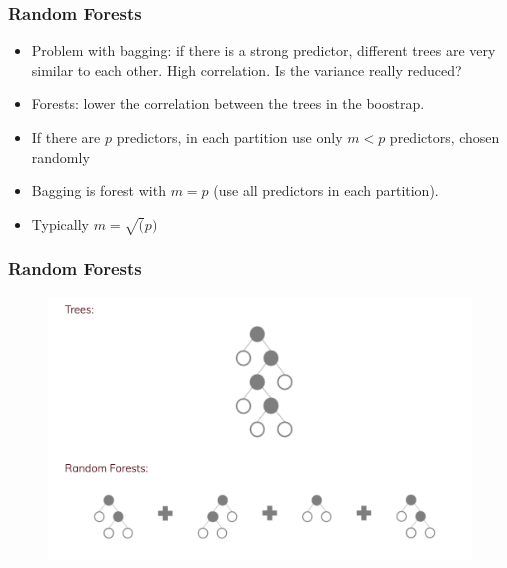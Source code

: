 \documentclass[
  shownotes,
  xcolor={svgnames},
  hyperref={colorlinks,citecolor=DarkBlue,linkcolor=DarkRed,urlcolor=DarkBlue}
  , aspectratio=169]{beamer}
\begin{document}
\begin{frame}[fragile]
\frametitle{Random Forests}

\begin{itemize}
\item Problem with bagging: if there is a strong predictor, different trees are very similar to each other. High correlation. Is the variance really reduced?
\bigskip
\item Forests: lower the correlation between the trees in the boostrap.
\bigskip
\item If there are $p$ predictors, in each partition use only $m <p$ predictors, chosen randomly
\bigskip
\item Bagging is forest with $m = p$ (use all predictors in each partition).
\bigskip
\item Typically $m = \sqrt(p)$
\end{itemize}

\end{frame}
\begin{frame}[fragile]
\frametitle{Random Forests}

\begin{figure}[H] \centering
            \captionsetup{justification=centering}
              \includegraphics[scale=0.4]{figures/trees_to_forests.png}
 \end{figure}
\end{frame}
\end{document}
